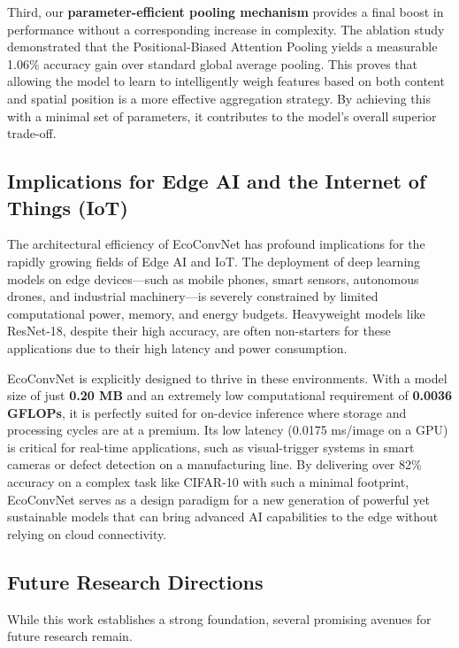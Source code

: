 \documentclass[12pt, a4paper]{article}
\begin{document}
Third, our \textbf{parameter-efficient pooling mechanism} provides a final boost in performance without a corresponding increase in complexity. The ablation study demonstrated that the Positional-Biased Attention Pooling yields a measurable 1.06\% accuracy gain over standard global average pooling. This proves that allowing the model to learn to intelligently weigh features based on both content and spatial position is a more effective aggregation strategy. By achieving this with a minimal set of parameters, it contributes to the model's overall superior trade-off.

\subsection{Implications for Edge AI and the Internet of Things (IoT)}
\label{ssec:implications}

The architectural efficiency of EcoConvNet has profound implications for the rapidly growing fields of Edge AI and IoT. The deployment of deep learning models on edge devices—such as mobile phones, smart sensors, autonomous drones, and industrial machinery—is severely constrained by limited computational power, memory, and energy budgets. Heavyweight models like ResNet-18, despite their high accuracy, are often non-starters for these applications due to their high latency and power consumption.

EcoConvNet is explicitly designed to thrive in these environments. With a model size of just \textbf{0.20 MB} and an extremely low computational requirement of \textbf{0.0036 GFLOPs}, it is perfectly suited for on-device inference where storage and processing cycles are at a premium. Its low latency (0.0175 ms/image on a GPU) is critical for real-time applications, such as visual-trigger systems in smart cameras or defect detection on a manufacturing line. By delivering over 82\% accuracy on a complex task like CIFAR-10 with such a minimal footprint, EcoConvNet serves as a design paradigm for a new generation of powerful yet sustainable models that can bring advanced AI capabilities to the edge without relying on cloud connectivity.

\subsection{Future Research Directions}
\label{ssec:future_work}

While this work establishes a strong foundation, several promising avenues for future research remain.
\end{document}
